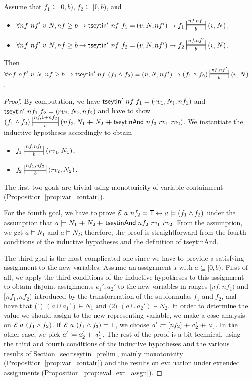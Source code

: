 \begin{lemma}\label{lem:compat_and}
  Assume that $f_1 \subseteq [0, b)$, $f_2 \subseteq [0, b)$, and 
  \begin{itemize}
    \item $\forall nf~nf'~v~N, nf \ge b \rightarrow \tseytin'~nf~f_1 = (v, N, nf') \rightarrow f_1 \Frepr{nf}{nf'}{b} (v, N)$,
    \item $\forall nf~nf'~v~N, nf \ge b \rightarrow \tseytin'~nf~f_2 = (v, N, nf') \rightarrow f_2 \Frepr{nf}{nf'}{b} (v, N)$.
  \end{itemize}
  Then $\forall nf~nf'~v~N, nf \ge b \rightarrow \tseytin'~nf~(f_1 \land f_2) = (v, N, nf') \rightarrow (f_1 \land f_2) \Frepr{nf}{nf'}{b} (v, N)$.
\end{lemma}
\begin{proof}
  By computation, we have $\textsf{tseytin}'~nf~f_1 = (rv_1, N_1, nf_1)$ and $\textsf{tseytin}'~nf_1~f_2 = (rv_2, N_2, nf_2)$ and have to show $(f_1 \land f_2) \Frepr{nf}{\natS{nf_2}}{b} (nf_2, N_1 \concat N_2 \concat \textsf{tseytinAnd}~nf_2~rv_1~rv_2)$. 
  We instantiate the inductive hypotheses accordingly to obtain 
  \begin{itemize}
    \item $f_1 \Frepr{nf}{nf_1}{b} (rv_1, N_1)$,
    \item $f_2 \Frepr{nf_1}{nf_2}{b} (rv_2, N_2)$.
  \end{itemize}
  The first two goals are trivial using monotonicity of variable containment (Proposition~\ref{prop:var_contain}). 

  For the fourth goal, we have to prove $\mathcal{E}~a~nf_2 = \mathsf{T} \leftrightarrow a \models (f_1 \land f_2)$ under the assumption that $a \models N_1 \mathbin{+\mkern-10mu+} N_2 \mathbin{+\mkern-10mu+} \textsf{tseytinAnd}~nf_2~rv_1~rv_2$. From the assumption, we get $a \models N_1$ and $a \models N_2$; therefore, the proof is straightforward from the fourth conditions of the inductive hypotheses and the definition of \textsf{tseytinAnd}.

  The third goal is the most complicated one since we have to provide a satisfying assignment to the new variables. Assume an assignment $a$ with $a \subseteq [0, b)$. 
  First of all, we apply the third conditions of the inductive hypotheses to this assignment to obtain disjoint assignments $a_1', a_2'$ to the new variables in ranges $[nf, nf_1)$ and $[nf_1, nf_2)$ introduced by the transformation of the subformulas $f_1$ and $f_2$, and have that (1) $(a \cup a_1') \models N_1$ and (2) $(a \cup a_2') \models N_2$. 
  In order to determine the value we should assign to the new representing variable, we make a case analysis on $\mathcal{E}~a~(f_1 \land f_2)$. If $\mathcal{E}~a~(f_1 \land f_2) = \mathsf{T}$, we choose $a' \coloneqq [nf_2] \mathbin{+\mkern-10mu+} a_2' \mathbin{+\mkern-10mu+} a_1'$. In the other case, we pick $a' \coloneqq a_2' \mathbin{+\mkern-10mu+} a_1'$. 
  The rest of the proof is a bit technical, using the third and fourth conditions of the inductive hypotheses and the various results of Section~\ref{sec:tseytin_prelim}, mainly monotonicity (Proposition~\ref{prop:var_contain}) and the results on evaluation under extended assignments (Proposition~\ref{prop:eval_ext_assgn}). 
\end{proof}

